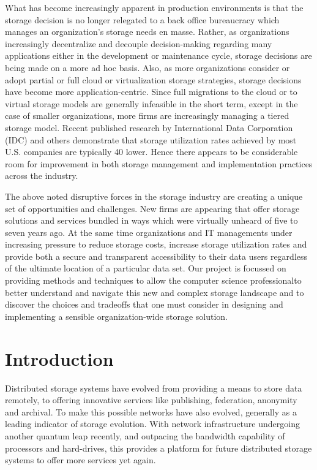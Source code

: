 \documentclass[11pt]{article}
\begin{document}
What has become increasingly apparent in production environments is 
that the storage decision is no longer relegated to a back office 
bureaucracy which manages an organization’s storage needs en masse. 
Rather, as organizations increasingly decentralize and decouple 
decision-making regarding many applications either in the development 
or maintenance cycle, storage decisions are being made on a more ad hoc 
basis. Also, as more organizations consider or adopt partial or full 
cloud or virtualization storage strategies, storage decisions have 
become more application-centric. Since full migrations to the cloud or 
to virtual storage models are generally infeasible in the short term, 
except in the case of smaller organizations, more firms are increasingly 
managing a tiered storage model. Recent published research by 
International Data Corporation (IDC) and others demonstrate that storage 
utilization rates achieved by most U.S. companies are typically 40%
lower. Hence there appears to be considerable room for improvement in 
both storage management and implementation practices across the industry. 

The above noted disruptive forces in the storage industry are creating a 
unique set of opportunities and challenges. New firms are appearing that 
offer storage solutions and services bundled in ways which were virtually 
unheard of five to seven years ago. At the same time organizations and IT 
managements under increasing pressure to reduce storage costs, increase 
storage utilization rates and provide both a secure and transparent 
accessibility to their data users regardless of the ultimate location of a 
particular data set. Our project is focussed on providing methods and 
techniques to allow the computer science professionalto better understand 
and navigate this new and complex storage landscape and to discover the 
choices and tradeoffs that one must consider in designing and implementing 
a sensible organization-wide storage solution.

\section{Introduction}
Distributed storage systems have evolved from providing a means to store 
data remotely, to offering innovative services like publishing, federation, 
anonymity and archival. To make this possible networks have also evolved, 
generally as a leading indicator of storage evolution. With network 
infrastructure undergoing another quantum leap recently, and outpacing the 
bandwidth capability of processors and hard-drives, this provides a platform 
for future distributed storage systems to offer more services yet again. 
\end{document}
